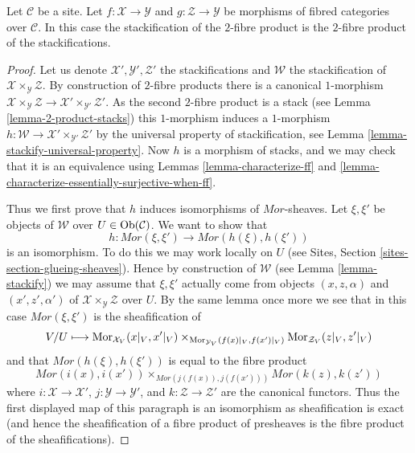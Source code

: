 \begin{lemma}
\label{lemma-stackification-fibre-product-fibred-categories}
Let $\mathcal{C}$ be a site.
Let $f : \mathcal{X} \to \mathcal{Y}$ and $g : \mathcal{Z} \to \mathcal{Y}$
be morphisms of fibred categories over $\mathcal{C}$.
In this case the stackification of the $2$-fibre product is the $2$-fibre
product of the stackifications.
\end{lemma}

\begin{proof}
Let us denote $\mathcal{X}', \mathcal{Y}', \mathcal{Z}'$ the stackifications
and $\mathcal{W}$ the stackification of
$\mathcal{X} \times_\mathcal{Y} \mathcal{Z}$. By construction of $2$-fibre
products there is a canonical $1$-morphism
$\mathcal{X} \times_\mathcal{Y} \mathcal{Z} \to
\mathcal{X}' \times_{\mathcal{Y}'} \mathcal{Z}'$.
As the second $2$-fibre product is a stack (see
Lemma \ref{lemma-2-product-stacks})
this $1$-morphism induces a $1$-morphism
$h : \mathcal{W} \to \mathcal{X}' \times_{\mathcal{Y}'} \mathcal{Z}'$
by the universal property of stackification, see
Lemma \ref{lemma-stackify-universal-property}.
Now $h$ is a morphism of stacks, and we may check that it is an
equivalence using
Lemmas \ref{lemma-characterize-ff} and
\ref{lemma-characterize-essentially-surjective-when-ff}.

\medskip\noindent
Thus we first prove that $h$ induces isomorphisms of $\mathit{Mor}$-sheaves.
Let $\xi, \xi'$ be objects of $\mathcal{W}$ over
$U \in \mathop{\mathrm{Ob}}\nolimits(\mathcal{C})$. We want to show that
$$
h : \mathit{Mor}(\xi, \xi') \longrightarrow \mathit{Mor}(h(\xi), h(\xi'))
$$
is an isomorphism. To do this we may work locally on $U$ (see
Sites, Section \ref{sites-section-glueing-sheaves}).
Hence by construction of $\mathcal{W}$ (see
Lemma \ref{lemma-stackify})
we may assume that $\xi, \xi'$
actually come from objects $(x, z, \alpha)$ and $(x', z', \alpha')$
of $\mathcal{X} \times_\mathcal{Y} \mathcal{Z}$ over $U$.
By the same lemma once more we see that in this case
$\mathit{Mor}(\xi, \xi')$ is the sheafification of
$$
V/U \longmapsto
\mathop{\mathrm{Mor}}\nolimits_{\mathcal{X}_V}(x|_V, x'|_V)
\times_{\mathop{\mathrm{Mor}}\nolimits_{\mathcal{Y}_V}(f(x)|_V, f(x')|_V)}
\mathop{\mathrm{Mor}}\nolimits_{\mathcal{Z}_V}(z|_V, z'|_V)
$$
and that $\mathit{Mor}(h(\xi), h(\xi'))$ is equal to the fibre product
$$
\mathit{Mor}(i(x), i(x'))
\times_{\mathit{Mor}(j(f(x)), j(f(x')))}
\mathit{Mor}(k(z), k(z'))
$$
where $i : \mathcal{X} \to \mathcal{X}'$,
$j : \mathcal{Y} \to \mathcal{Y}'$, and
$k : \mathcal{Z} \to \mathcal{Z}'$ are the canonical functors.
Thus the first displayed map of this paragraph is an isomorphism as
sheafification is exact (and hence the sheafification of a fibre product
of presheaves is the fibre product of the sheafifications).


\end{proof}
